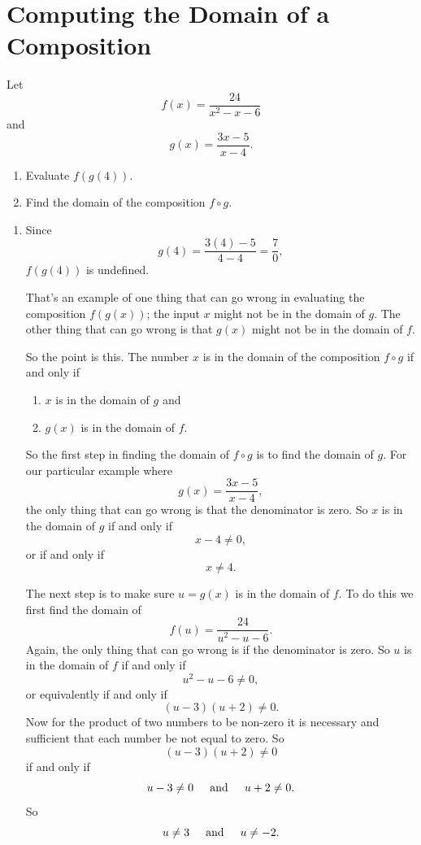 \documentclass{ximera}
\begin{document}
\section{Computing the Domain of a Composition}
\begin{example} \label{Edf300}
Let
\[
    f(x) = \frac{24}{x^2-x-6}
\]
and 
\[
    g(x) = \frac{3x-5}{x-4} .
\]
\begin{enumerate}
\item Evaluate $f(g(4))$.

\item Find the domain of the composition $f\circ g$.
\end{enumerate}

\begin{explanation}
\begin{enumerate}
\item Since 
\[
 g(4) = \frac{3(4) - 5}{4 -4} = \frac{7}{0},
\]
$f(g(4))$ is undefined.

That's an example of one thing that can go wrong in evaluating the composition $f(g(x))$; the input $x$ might not be in the domain of $g$. The other thing that can go wrong is that $g(x)$ might not be in the domain of $f$.

So the point is this. The number $x$ is in the domain of the composition $f\circ g$ if and only if
\begin{enumerate}
\item $x$ is in the domain of $g$ and

\item $g(x)$ is in the domain of $f$.
\end{enumerate}

So the first step in finding the domain of $f\circ g$ is to find the domain of $g$. For our particular example where
\[
     g(x) = \frac{3x-5}{x-4},  
\]
the only thing that can go wrong is that the denominator is zero. So $x$ is in the domain of $g$ if and only if
\[
   x - 4 \neq 0,
\]
or if and only if
\[
     x \neq 4.
\]

The next step is to make sure $u=g(x)$ is in the domain of $f$. To do this we first find the domain of
\[
      f(u) = \frac{24}{u^2-u-6}.
\]
Again, the only thing that can go wrong is if the denominator is zero. So $u$ is in the domain of $f$ if and only if
\[
    u^2 - u - 6 \neq 0,
\]
or equivalently if and only if
\[
  (u-3)(u+2) \neq 0.
\]
Now for the product of two numbers to be non-zero it is necessary and sufficient that each number be not equal to zero. So 
\[
  (u-3)(u+2) \neq 0
\]
if and only if
\[
       u - 3 \neq 0  \hskip 0.2 in \text{and} \hskip 0.2 in u+2 \neq 0.
\]
So
\[
   u \neq 3  \hskip 0.2 in \text{and} \hskip 0.2 in u \neq -2.
\]
 

\end{enumerate}
\end{explanation}
\end{example}
\end{document}
